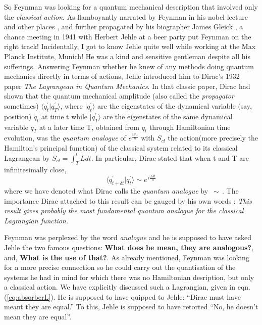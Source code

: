 \documentclass[12pt]{article}
\newcommand{\be}{\begin{equation}}
\newcommand{\ee}{\end{equation}}
\begin{document}
So Feynman was looking for a quantum mechanical description that involved only the {\it classical action}. As flamboyantly narrated by 
Feynman in his nobel lecture \cite{nobel} and other places \cite{joking}, and further propagated by his biographer
James Gleick \cite{gleick}, a chance meeting in 1941 with Herbert Jehle at a beer party put Feynman on the right track! Incidentally, 
I got to know Jehle quite well while working at the Max Planck Institute, Munich! He was a kind and sensitive gentleman despite all his 
sufferings. Answering Feynman whether he knew of any methods doing quantum mechanics directly in terms of actions, Jehle introduced him to 
Dirac's 1932 paper {\it The Lagrangean in Quantum Mechanics}\cite{diracpaper}. In that classic paper, Dirac had shown that the
quantum mechanical amplitude (also called the {\it propagator} sometimes) $ \langle q^\prime_t|q^\prime_T\rangle $,
where $|q^\prime_t\rangle$ are the eigenstates of the dynamical variable (say, position) $q_t$ at time t while $|q^\prime_T\rangle$
are the eigenstates of the same dynamical variable $q_T$ at a later time T, obtained from $q_t$ through Hamiltonian time evolution, was
the {\it quantum analogue} of $ e^{\frac{iS_{cl}}{\hbar}} $ with $S_{cl}$ the action(more precisely the Hamilton's principal function) of the 
classical system related to its classical Lagrangean by $ S_{cl} = \int_T^{t}L dt $. In particular, Dirac stated that when t and T are 
infinitesimally close,
\be
\label{eq:qanalogue}
\langle q^\prime_{t+\delta t}|q^\prime_t\rangle \sim  e^{\,i \frac {L \delta t}{\hbar}}
\ee
where we have denoted what Dirac calls the {\it quantum analogue} by $\,\sim\,$. The importance Dirac attached to this result can be gauged
by his own words \cite{diracbook2}: {\it This result gives probably the most fundamental quantum analogue for the classical Lagrangian 
function.}

Feynman was perplexed by the word {\it analogue} and he is supposed to have asked Jehle the two famous questions:
{\bf What does he mean, they are analogous?}, and, {\bf What is the use of that?}. As already mentioned,
Feynman was looking for a more precise connection so he could carry out the quantisation of the systems he had in mind for which
there was no Hamiltonian desription, but only a classical action. We have explicitly discussed such a Lagrangian, given in 
eqn.(\ref{eq:absorberL}). He is supposed to have quipped to Jehle: ``Dirac must have meant they are
equal.'' To this, Jehle is supposed to have retorted ``No, he doesn't mean they are equal''.  
\end{document}
